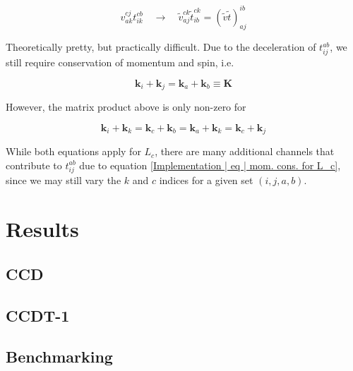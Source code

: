 \documentclass[10pt]{report}
\begin{document}
	\begin{equation}
		v_{ak}^{cj}t_{ik}^{cb} \quad\rightarrow\quad \tilde{v}_{aj}^{ck}\tilde{t}_{ib}^{ck} = \left(\tilde{v}\tilde{t}\right)_{aj}^{ib}
	\end{equation}
	
	Theoretically pretty, but practically difficult. Due to the deceleration of $t_{ij}^{ab}$, we still require conservation of momentum and spin, i.e.
	
	\begin{equation}
		\bm{k}_i + \bm{k}_j = \bm{k}_a + \bm{k}_b \equiv \bm{K}
	\end{equation}
	
	However, the matrix product above is only non-zero for
	
	\begin{equation}
		\bm{k}_i + \bm{k}_k = \bm{k}_c + \bm{k}_b = \bm{k}_a + \bm{k}_k = \bm{k}_c + \bm{k}_j
		\label{Implementation | eq | mom. cons. for L_c}
	\end{equation}
	
	While both equations apply for $L_c$, there are many additional channels that contribute to $t_{ij}^{ab}$ due to equation \ref{Implementation | eq | mom. cons. for L_c}, since we may still vary the $k$ and $c$ indices for a given set $(i,j,a,b)$.
	
	\chapter{Results}
	
	\section{CCD}
	\section{CCDT-1}
	\section{Benchmarking}
	
\end{document}
